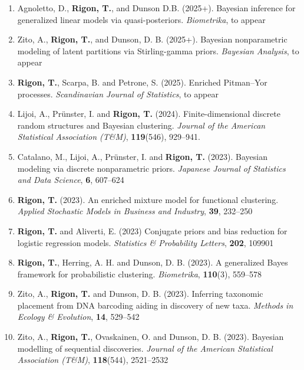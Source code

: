 \documentclass[10pt]{article}
\begin{document}
\begin{enumerate}

\item Agnoletto, D., \textbf{Rigon, T.}, and Dunson D.B. (2025+). Bayesian inference for generalized linear models via quasi-posteriors. \emph{Biometrika}, to appear

\item Zito, A., \textbf{Rigon, T.}, and Dunson, D. B. (2025+). Bayesian nonparametric modeling of latent partitions via Stirling-gamma priors. \textit{Bayesian Analysis}, to appear

\item \textbf{Rigon, T.}, Scarpa, B. and Petrone, S. (2025). Enriched Pitman--Yor processes. \textit{Scandinavian Journal of Statistics}, to appear

\item Lijoi, A., Pr\"unster, I. and \textbf{Rigon, T.} (2024). Finite-dimensional discrete random structures and Bayesian clustering. \textit{Journal of the American Statistical Association (T\&M)}, \textbf{119}(546), 929--941. 

\item Catalano, M., Lijoi, A., Pr\"unster, I. and \textbf{Rigon, T.} (2023). Bayesian modeling via discrete nonparametric priors. \textit{Japanese Journal of Statistics and Data Science}, \textbf{6}, 607--624

\item \textbf{Rigon, T.} (2023). An enriched mixture model for functional clustering. \emph{Applied Stochastic Models in Business and Industry}, \textbf{39}, 232--250

\item \textbf{Rigon, T.} and Aliverti, E. (2023) Conjugate priors and bias reduction for logistic regression models. \textit{Statistics \& Probability Letters}, \textbf{202}, 109901

\item \textbf{Rigon, T.}, Herring, A. H. and Dunson, D. B. (2023). A generalized Bayes framework for probabilistic clustering. \textit{Biometrika}, \textbf{110}(3), 559--578

\item Zito, A., \textbf{Rigon, T.} and Dunson, D. B. (2023). Inferring taxonomic placement from DNA barcoding aiding in discovery of new taxa. \emph{Methods in Ecology \& Evolution}, \textbf{14}, 529--542

\item Zito, A., \textbf{Rigon, T.}, Ovaskainen, O. and Dunson, D. B. (2023). Bayesian modelling of sequential discoveries. \textit{Journal of the American Statistical Association (T\&M)}, \textbf{118}(544), 2521--2532


\end{enumerate}
\end{document}
